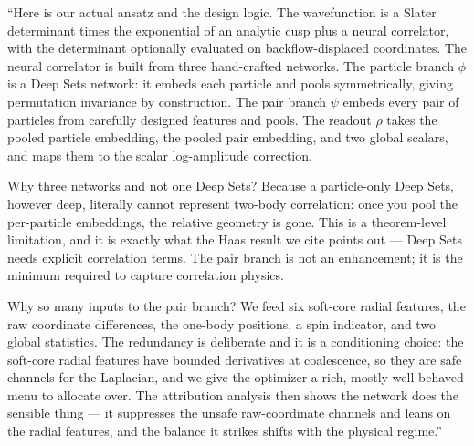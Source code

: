 \documentclass[11pt]{article}
\begin{document}
\begin{say}
``Here is our actual ansatz and the design logic. The wavefunction is a Slater determinant times the
exponential of an analytic cusp plus a neural correlator, with the determinant optionally evaluated
on backflow-displaced coordinates. The neural correlator is built from three hand-crafted networks.
The particle branch $\phi$ is a Deep Sets network: it embeds each particle and pools symmetrically,
giving permutation invariance by construction. The pair branch $\psi$ embeds every pair of particles
from carefully designed features and pools. The readout $\rho$ takes the pooled particle embedding,
the pooled pair embedding, and two global scalars, and maps them to the scalar log-amplitude
correction.

Why three networks and not one Deep Sets? Because a particle-only Deep Sets, however deep, literally
cannot represent two-body correlation: once you pool the per-particle embeddings, the relative
geometry is gone. This is a theorem-level limitation, and it is exactly what the Haas result we cite
points out --- Deep Sets needs explicit correlation terms. The pair branch is not an enhancement; it
is the minimum required to capture correlation physics.

Why so many inputs to the pair branch? We feed six soft-core radial features, the raw coordinate
differences, the one-body positions, a spin indicator, and two global statistics. The redundancy is
deliberate and it is a conditioning choice: the soft-core radial features have bounded derivatives at
coalescence, so they are safe channels for the Laplacian, and we give the optimizer a rich, mostly
well-behaved menu to allocate over. The attribution analysis then shows the network does the
sensible thing --- it suppresses the unsafe raw-coordinate channels and leans on the radial features,
and the balance it strikes shifts with the physical regime.''
\end{say}
\end{document}
